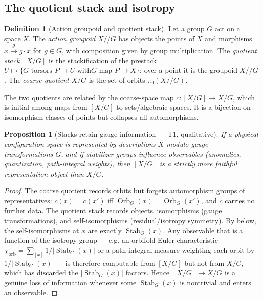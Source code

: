 \documentclass[12pt]{article}
\newtheorem{proposition}[theorem]{Proposition}
\theoremstyle{definition}
\newtheorem{definition}[theorem]{Definition}
\theoremstyle{remark}
\newcommand{\Stab}{\operatorname{Stab}}
\newcommand{\Orb}{\operatorname{Orb}}
\newcommand{\quot}[2]{[#1/#2]}
\begin{document}
\subsection{The quotient stack and isotropy}

\begin{definition}[Action groupoid and quotient stack]
\label{def:quotient-stack}
Let a group $G$ act on a space $X$. The \emph{action groupoid} $X/\!\!/G$ has objects
the points of $X$ and morphisms $x\xrightarrow{g}g\cdot x$ for $g\in G$, with
composition given by group multiplication. The \emph{quotient stack} $\quot{X}{G}$ is
the stackification of the prestack $U\mapsto \{G\text{-torsors }P\to U \text{ with
}G\text{-map } P\to X\}$; over a point it is the groupoid $X/\!\!/G$. The \emph{coarse
quotient} $X/G$ is the set of orbits $\pi_0(X/\!\!/G)$.
\end{definition}

The two quotients are related by the coarse-space map $c:\quot{X}{G}\to X/G$, which is
initial among maps from $\quot{X}{G}$ to sets/algebraic spaces. It is a bijection on
isomorphism classes of points but collapses all automorphisms.

\begin{proposition}[Stacks retain gauge information --- T1, qualitative]
\label{prop:stacks-retain}
If a physical configuration space is represented by descriptions $X$ modulo gauge
transformations $G$, and if stabilizer groups influence observables (anomalies,
quantization, path-integral weights), then $\quot{X}{G}$ is a strictly more faithful
representation object than $X/G$.
\end{proposition}

\begin{proof}
The coarse quotient records orbits but forgets automorphism groups of representatives:
$c(x)=c(x')$ iff $\Orb_G(x)=\Orb_G(x')$, and $c$ carries no further data. The quotient
stack records objects, isomorphisms (gauge transformations), and self-isomorphisms
(residual/isotropy symmetry). By  below, the self-isomorphisms at
$x$ are exactly $\Stab_G(x)$. Any observable that is a function of the isotropy group
--- e.g. an orbifold Euler characteristic $\chi_{\mathrm{orb}}=\sum_{[x]}
1/|\Stab_G(x)|$ or a path-integral measure weighting each orbit by $1/|\Stab_G(x)|$ ---
is therefore computable from $\quot{X}{G}$ but not from $X/G$, which has discarded the
$|\Stab_G(x)|$ factors. Hence $\quot{X}{G}\to X/G$ is a genuine loss of information
whenever some $\Stab_G(x)$ is nontrivial and enters an observable.
\end{proof}
\end{document}

